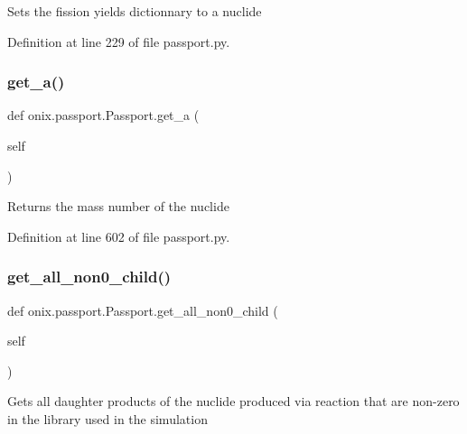 \begin{DoxyVerb}Sets the fission yields dictionnary to a nuclide\end{DoxyVerb}
 

Definition at line 229 of file passport.\+py.

\mbox{\label{classonix_1_1passport_1_1Passport_a2f70340eb9f6cfaa5f189486c263648a}} 
\subsubsection{\texorpdfstring{get\+\_\+a()}{get\_a()}}
{\footnotesize\ttfamily def onix.\+passport.\+Passport.\+get\+\_\+a (\begin{DoxyParamCaption}\item[{}]{self }\end{DoxyParamCaption})}

\begin{DoxyVerb}Returns the mass number of the nuclide\end{DoxyVerb}
 

Definition at line 602 of file passport.\+py.

\mbox{\label{classonix_1_1passport_1_1Passport_ae9994c2e5527433c781a08721ab739f7}} 
\subsubsection{\texorpdfstring{get\+\_\+all\+\_\+non0\+\_\+child()}{get\_all\_non0\_child()}}
{\footnotesize\ttfamily def onix.\+passport.\+Passport.\+get\+\_\+all\+\_\+non0\+\_\+child (\begin{DoxyParamCaption}\item[{}]{self }\end{DoxyParamCaption})}

\begin{DoxyVerb}Gets all daughter products of the nuclide produced via reaction that are non-zero in the library used in the simulation\end{DoxyVerb}
 

